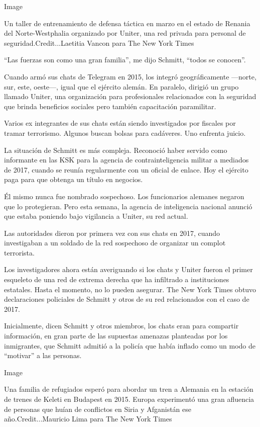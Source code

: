 Image

Un taller de entrenamiento de defensa táctica en marzo en el estado de
Renania del Norte-Westphalia organizado por Uniter, una red privada para
personal de seguridad.Credit...Laetitia Vancon para The New York Times

``Las fuerzas son como una gran familia'', me dijo Schmitt, ``todos se
conocen''.

Cuando armó sus chats de Telegram en 2015, los integró geográficamente
---norte, sur, este, oeste---, igual que el ejército alemán. En
paralelo, dirigió un grupo llamado Uniter, una organización para
profesionales relacionados con la seguridad que brinda beneficios
sociales pero también capacitación paramilitar.

Varios ex integrantes de sus chats están siendo investigados por
fiscales por tramar terrorismo. Algunos buscan bolsas para cadáveres.
Uno enfrenta juicio.

La situación de Schmitt es más compleja. Reconoció haber servido como
informante en las KSK para la agencia de contrainteligencia militar a
mediados de 2017, cuando se reunía regularmente con un oficial de
enlace. Hoy el ejército paga para que obtenga un título en negocios.

Él mismo nunca fue nombrado sospechoso. Los funcionarios alemanes
negaron que lo protegieran. Pero esta semana, la agencia de inteligencia
nacional anunció que estaba poniendo bajo vigilancia a Uniter, su red
actual.

Las autoridades dieron por primera vez con sus chats en 2017, cuando
investigaban a un soldado de la red sospechoso de organizar un complot
terrorista.

Los investigadores ahora están averiguando si los chats y Uniter fueron
el primer esqueleto de una red de extrema derecha que ha infiltrado a
instituciones estatales. Hasta el momento, no lo pueden asegurar. The
New York Times obtuvo declaraciones policiales de Schmitt y otros de su
red relacionados con el caso de 2017.

Inicialmente, dicen Schmitt y otros miembros, los chats eran para
compartir información, en gran parte de las supuestas amenazas
planteadas por los inmigrantes, que Schmitt admitió a la policía que
había inflado como un modo de ``motivar'' a las personas.

Image

Una familia de refugiados esperó para abordar un tren a Alemania en la
estación de trenes de Keleti en Budapest en 2015. Europa experimentó una
gran afluencia de personas que huían de conflictos en Siria y Afganistán
ese año.Credit...Mauricio Lima para The New York Times

